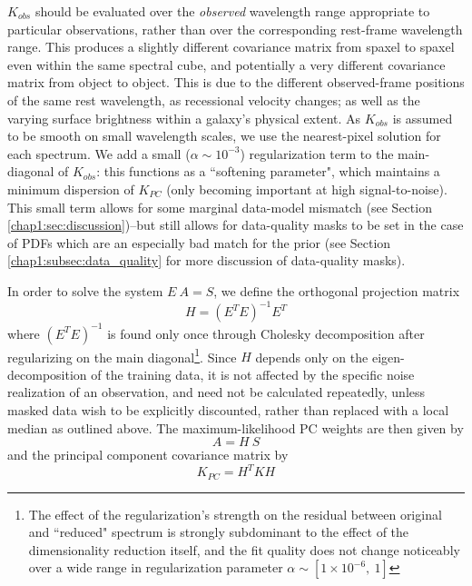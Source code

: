 $K_{obs}$ should be evaluated over the \emph{observed} wavelength range appropriate to particular observations, rather than over the corresponding rest-frame wavelength range. This produces a slightly different covariance matrix from spaxel to spaxel even within the same spectral cube, and potentially a very different covariance matrix from object to object. This is due to the different observed-frame positions of the same rest wavelength, as recessional velocity changes; as well as the varying surface brightness within a galaxy's physical extent. As $K_{obs}$ is assumed to be smooth on small wavelength scales, we use the nearest-pixel solution for each spectrum. We add a small ($\alpha \sim 10^{-3}$) regularization term to the main-diagonal of $K_{obs}$: this functions as a ``softening parameter", which maintains a minimum dispersion of $K_{PC}$ (only becoming important at high signal-to-noise). This small term allows for some marginal data-model mismatch (see Section \ref{chap1:sec:discussion})--but still allows for data-quality masks to be set in the case of PDFs which are an especially bad match for the prior (see Section \ref{chap1:subsec:data_quality} for more discussion of data-quality masks).

In order to solve the system $E ~ A = S$, we define the orthogonal projection matrix
%
\begin{equation}
    H = (E^T E)^{-1} E^T
\end{equation}
%
where $(E^T E)^{-1}$ is found only once through Cholesky decomposition \citep[one method of decomposing a Hermitian, positive-definite matrix into the product of a lower-triangular matrix and its conjugate transpose, ][]{numerical-recipes_1986} after regularizing on the main diagonal\footnote{The effect of the regularization's strength on the residual between original and ``reduced" spectrum is strongly subdominant to the effect of the dimensionality reduction itself, and the fit quality does not change noticeably over a wide range in regularization parameter $\alpha \sim [1 \times 10^{-6},~1]$}. Since $H$ depends only on the eigen-decomposition of the training data, it is not affected by the specific noise realization of an observation, and need not be calculated repeatedly, unless masked data wish to be explicitly discounted, rather than replaced with a local median as outlined above. The maximum-likelihood PC weights are then given by
%
\begin{equation}
    A = H ~ S
\end{equation}
%
and the principal component covariance matrix by
%
\begin{equation}
    K_{PC} = H^T K H
\end{equation}

